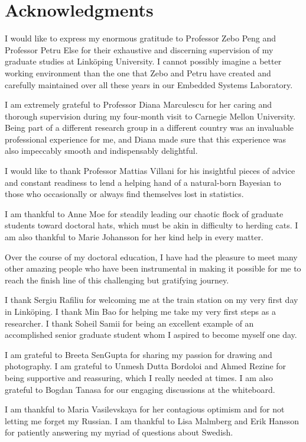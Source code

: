 \chapter*{Acknowledgments}

I would like to express my enormous gratitude to Professor Zebo Peng and
Professor Petru Else for their exhaustive and discerning supervision of my
graduate studies at Linköping University. I cannot possibly imagine a better
working environment than the one that Zebo and Petru have created and carefully
maintained over all these years in our Embedded Systems Laboratory.

I am extremely grateful to Professor Diana Marculescu for her caring and
thorough supervision during my four-month visit to Carnegie Mellon University.
Being part of a different research group in a different country was an
invaluable professional experience for me, and Diana made sure that this
experience was also impeccably smooth and indispensably delightful.

I would like to thank Professor Mattias Villani for his insightful pieces of
advice and constant readiness to lend a helping hand of a natural-born Bayesian
to those who occasionally or always find themselves lost in statistics.

I am thankful to Anne Moe for steadily leading our chaotic flock of graduate
students toward doctoral hats, which must be akin in difficulty to herding cats.
I am also thankful to Marie Johansson for her kind help in every matter.

Over the course of my doctoral education, I have had the pleasure to meet many
other amazing people who have been instrumental in making it possible for me to
reach the finish line of this challenging but gratifying journey.

I thank Sergiu Rafiliu for welcoming me at the train station on my very first
day in Linköping. I thank Min Bao for helping me take my very first steps as a
researcher. I thank Soheil Samii for being an excellent example of an
accomplished senior graduate student whom I aspired to become myself one day.

I am grateful to Breeta SenGupta for sharing my passion for drawing and
photography. I am grateful to Unmesh Dutta Bordoloi and Ahmed Rezine for being
supportive and reassuring, which I really needed at times. I am also grateful to
Bogdan Tanasa for our engaging discussions at the whiteboard.

I am thankful to Maria Vasilevskaya for her contagious optimism and for not
letting me forget my Russian. I am thankful to Lisa Malmberg and Erik Hansson
for patiently answering my myriad of questions about Swedish.

